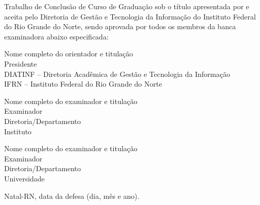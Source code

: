 \begin{folhadeaprovacao}
	\setlength{\ABNTsignthickness}{0.4pt}
	\setlength{\ABNTsignwidth}{10cm}
	
	\noindent 
	Trabalho de Conclusão de Curso de Graduação sob o título
	\textit{\writedocumenttitle} apresentada por \writeauthor e aceita pelo Diretoria
	de Gestão e Tecnologia da Informação do Instituto Federal do Rio Grande do
	Norte, sendo aprovada por todos os membros da banca examinadora abaixo especificada:
		
	\assinatura
	{
		Nome completo do orientador e titulação   			                  \\
		{\small Presidente}											          \smallskip\\ 
		{\footnotesize
			DIATINF -- Diretoria Acadêmica de Gestão e Tecnologia da Informação		   \\
		  	IFRN -- Instituto Federal do Rio Grande do Norte
		}
   }
      
   \assinatura
	{
      Nome completo do examinador e titulação   			                  \\
		{\small Examinador}											          \smallskip\\ 
		{\footnotesize
			Diretoria/Departamento		\\
		  	Instituto
		}
   }   
   
   \assinatura
	{
      Nome completo do examinador e titulação   			                  \\
		{\small Examinador}											          \smallskip\\ 
		{\footnotesize
			Diretoria/Departamento		\\
		  	Universidade
		}
	}
		
	\vfill
	
	\begin{center}
		Natal-RN, data da defesa (dia, mês e ano).
	\end{center}
\end{folhadeaprovacao}
